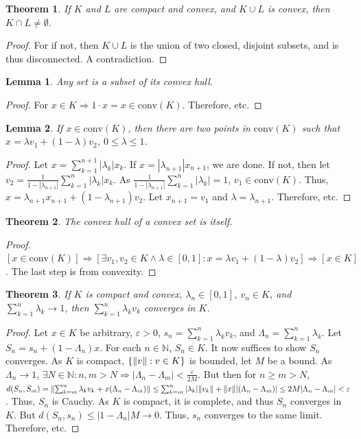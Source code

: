 \documentclass[12pt,oneside]{book}
\theoremstyle{mystyle}
\newtheorem{theorem}{Theorem}[section]
\newtheorem{lemma}{Lemma}[section]
\begin{document}
\begin{theorem}
If $K$ and $L$ are compact and convex, and $K\cup L$ is convex, then $K\cap L \ne \emptyset$.
\end{theorem}
\begin{proof}
For if not, then $K\cup L$ is the union of two closed, disjoint subsets, and is thus disconnected. A contradiction. 
\end{proof}
%
\begin{lemma}
Any set is a subset of its convex hull.
\end{lemma}
\begin{proof}
For $x\in K \Rightarrow 1\cdot x=x \in \textrm{conv}(K)$. Therefore, etc.
\end{proof}
%
\begin{lemma}
If $x\in \textrm{conv}(K)$, then there are two points in $\textrm{conv}(K)$ such that $x = \lambda v_1 +(1- \lambda) v_2$, $0 \leq \lambda \leq 1$.
\end{lemma}
\begin{proof}
Let $x=\sum_{k=1}^{n+1}|\lambda_k| x_k$. If $x=|\lambda_{n+1}|x_{n+1}$, we are done. If not, then let $v_2 = \frac{1}{1-|\lambda_{n+1}|}\sum_{k=1}^{n}|\lambda_k|x_k$. As $\frac{1}{1-|\lambda_{n+1}|}\sum_{k=1}^{n}|\lambda_k| = 1$, $v_1\in \textrm{conv}(K)$. Thus, $x = \lambda_{n+1}x_{n+1}+(1-\lambda_{n+1})v_2$. Let $x_{n+1}=v_1$ and $\lambda = \lambda_{n+1}$. Therefore, etc.
\end{proof}
%
\begin{theorem}
The convex hull of a convex set is itself.
\end{theorem}
\begin{proof}
$[x\in \textrm{conv}(K)]\Rightarrow [\exists v_1,v_2\in K\land \lambda\in[0,1]:x=\lambda v_1+(1-\lambda)v_2]\Rightarrow [x\in K]$. The last step is from convexity.
\end{proof}
%
\begin{theorem}
If $K$ is compact and convex, $\lambda_n\in[0,1]$, $v_n\in K$, and $\sum_{k=1}^{n}\lambda_k \rightarrow 1$, then $\sum_{k=1}^{n}\lambda_k v_k$ converges in $K$.
\end{theorem}
\begin{proof}
Let $x\in K$ be arbitrary, $\varepsilon>0$, $s_n = \sum_{k=1}^{n}\lambda_k v_k$, and $\Lambda_n = \sum_{k=1}^{n}\lambda_k$. Let $S_n = s_n + (1-\Lambda_n)x$. For each $n\in \mathbb{N}$, $S_n\in K$. It now suffices to show $S_n$ converges. As $K$ is compact, $\{\norm{v}:v\in K\}$ is bounded, let $M$ be a bound. As $\Lambda_n\rightarrow 1$, $\exists N\in \mathbb{N}:n,m>N\Rightarrow |\Lambda_n-\Lambda_m|<\frac{\varepsilon}{2M}$. But then for $n\geq m >N$, $d(S_n,S_m) = \norm{\sum_{k=m}^{n}\lambda_k v_k+x(\Lambda_n-\Lambda_m)} \leq \sum_{k=m}^{n}|\lambda_k| \norm{v_k}+\norm{x}|(\Lambda_n-\Lambda_m)|\leq 2M|\Lambda_{n}-\Lambda_{m}|<\varepsilon$. Thus, $S_n$ is Cauchy. As $K$ is compact, it is complete, and thus $S_n$ converges in $K$. But $d(S_n,s_n)\leq |1-\Lambda_n|M\rightarrow 0$. Thus, $s_n$ converges to the same limit. Therefore, etc.
\end{proof}
\end{document}
